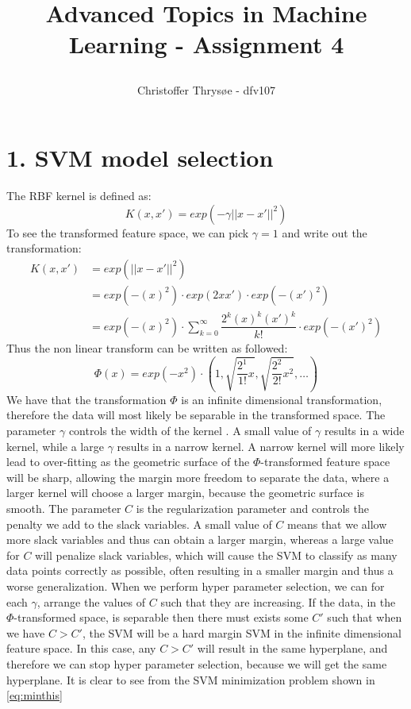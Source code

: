 \documentclass{article}
\title{
\vspace{1in}
\textmd{\textbf{Advanced Topics in Machine Learning - Assignment 4}} \\
\author{Christoffer Thrysøe - dfv107}
}
\begin{document}
\maketitle
{}
\section{1. SVM model selection}
The RBF kernel is defined as:
\begin{equation}
K(x,x') = exp(-\gamma || x - x'||^2)
\end{equation}
To see the transformed feature space, we can pick $\gamma=1$ and write out the transformation:
\begin{align}
K(x,x') &= exp(|| x - x'||^2) \\
&= exp(-(x)^2) \cdot exp(2xx') \cdot exp(-(x')^2) \\
&= exp(-(x)^2) \cdot \sum\limits_{k=0}^\infty \dfrac{2^k(x)^k(x')^k}{k!} \cdot exp(-(x')^2)
\end{align}
Thus the non linear transform can be written as followed:
\begin{equation}
\Phi(x) = exp(-x^2) \cdot \left( 1, \sqrt{\dfrac{2^1}{1!}x}, \sqrt{\dfrac{2^2}{2!}x^2}, \dots \right)
\end{equation}
We have that the transformation $\Phi$ is an infinite dimensional transformation, therefore the data will most likely be separable in the transformed space. The parameter $\gamma$ controls the width of the kernel . A small value of $\gamma$ results in a wide kernel, while a large $\gamma$ results in a narrow kernel. A narrow kernel will more likely lead to over-fitting as the geometric surface of the $\Phi$-transformed feature space will be sharp, allowing the margin more freedom to separate the data, where a larger kernel will choose a larger margin, because the geometric surface is smooth.
The parameter $C$ is the regularization parameter and controls the penalty we add to the slack variables. A small value of $C$ means that we allow more slack variables and thus can obtain a larger margin, whereas a large value for $C$ will penalize slack variables, which will cause the SVM
to classify as many data points correctly as possible, often resulting in a smaller margin and thus a worse generalization. When we perform hyper parameter selection, we can for each $\gamma$, arrange the values of $C$ such that they are increasing. If the data, in the $\Phi$-transformed space, is separable then there must exists some $C'$ such that when we have $C>C'$, the SVM will be a hard margin SVM in the infinite dimensional feature space. In this case, any $C>C'$ will result in the same hyperplane, and therefore we can stop hyper parameter selection, because we will get the same hyperplane. It is clear to see from the SVM minimization problem shown in \eqref{eq:minthis}
\end{document}
